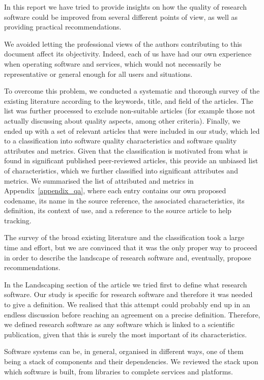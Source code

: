 
In this report we have tried to provide insights on how the quality of research software could be improved from several different points of view, as well as providing practical recommendations.

We avoided letting the professional views of the authors contributing to this document affect its objectivity. Indeed, each of us have had our own experience when operating software and services, which would not necessarily be representative or general enough for all users and situations.

To overcome this problem, we conducted a systematic and thorough survey of the existing literature according to the keywords, title, and field of the articles. The list was further processed to exclude non-suitable articles (for example  those not actually discussing about quality aspects, among other criteria). Finally, we ended up with a set of relevant articles that were included in our study, which led to a classification into software quality characteristics and software quality attributes and metrics. Given that the classification is motivated from what is found in significant published peer-reviewed articles, this provide an unbiased list of characteristics, which we further classified into significant attributes and metrics. We summarised the list of attributed and metrics in Appendix~\ref{appendix_qa}, where each entry contains our own proposed codename, its name in the source reference, the associated characteristics, its definition, its context of use, and a reference to the source article to help tracking.

The survey of the broad existing literature and the classification took a large time and effort, but we are convinced that it was the only proper way to proceed in order to describe the landscape of research software and, eventually, propose recommendations.

In the Landscaping section of the article we tried first to define what research software. Our study is specific for research software and therefore it was needed to give a definition. We realised that this attempt could probably end up in an endless discussion before reaching an agreement on a precise definition. Therefore, we defined research software as any software which is linked to a scientific publication, given that this is surely the most important of its characteristics. 

Software systems can be, in general, organised in different ways, one of them being a stack of components and their dependencies. We reviewed the stack upon which software is built, from libraries to complete services and platforms. 

